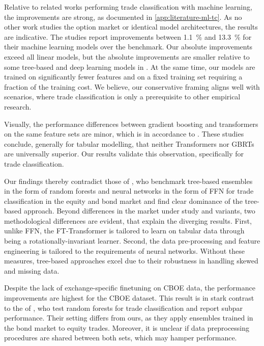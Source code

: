 Relative to related works performing trade classification with machine learning, the improvements are strong, as documented in \cref{app:literature-ml-tc}. As no other work studies the option market or identical model architectures, the results are indicative. The studies report improvements between \SI{1.1}{\percent} and \SI{13.3}{\percent} for their machine learning models over the benchmark. Our absolute improvements exceed all linear models, but the absolute improvements are smaller relative to some tree-based and deep learning models in \textcite[][49]{ronenMachineLearningTrade2022}. At the same time, our models are trained on significantly fewer features and on a fixed training set requiring a fraction of the training cost. We believe, our conservative framing aligns well with scenarios, where trade classification is only a prerequisite to other empirical research.

Visually, the performance differences between gradient boosting and transformers on the same feature sets are minor, which is in accordance to \textcites{grinsztajnWhyTreebasedModels2022}{gorishniyRevisitingDeepLearning2021}. These studies conclude, generally for tabular modelling, that neither Transformers nor \glspl{GBRT} are universally superior. Our results validate this observation, specifically for trade classification.

Our findings thereby contradict those of \textcite[][14--49]{ronenMachineLearningTrade2022}, who benchmark tree-based ensembles in the form of random forests and neural networks in the form of \gls{FFN} for trade classification in the equity and bond market and find clear dominance of the tree-based approach. Beyond differences in the market under study and variants, two methodological differences are evident, that explain the diverging results. First, unlike \gls{FFN}, the FT-Transformer is tailored to learn on tabular data through being a rotationally-invariant learner. Second, the data pre-processing and feature engineering is tailored to the requirements of neural networks. Without these measures, tree-based approaches excel due to their robustness in handling skewed and missing data.

Despite the lack of exchange-specific finetuning on \gls{CBOE} data, the performance improvements are highest for the \gls{CBOE} dataset. This result is in stark contrast to the of \textcite[][32]{ronenMachineLearningTrade2022}, who test random forests for trade classification and report subpar performance. Their setting differs from ours, as they apply ensembles trained in the bond market to equity trades. Moreover, it is unclear if data preprocessing procedures are shared between both sets, which may hamper performance. 

